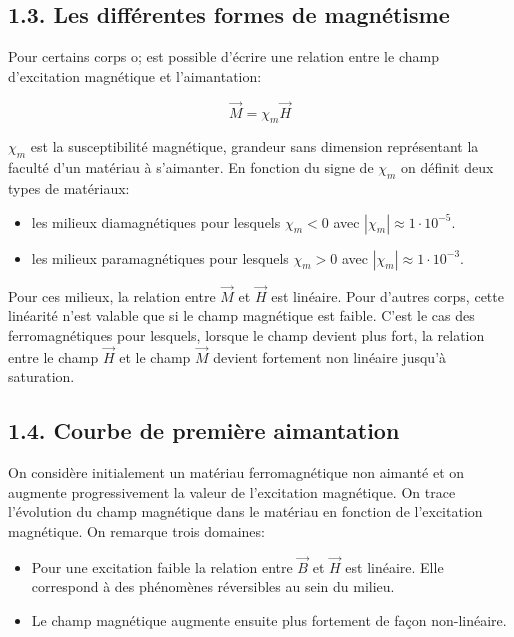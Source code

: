 \documentclass[french, a4paper, 10pt, twocolumn, landscape]{article}
\begin{document}
\subsection*{1.3. Les différentes formes de magnétisme}

Pour certains corps o; est possible d'écrire une relation entre le champ d'excitation magnétique et l'aimantation:

\begin{equation}
    \vec{M}=\chi_m\vec{H}
\end{equation}

$\chi_m$ est la susceptibilité magnétique, grandeur sans dimension représentant la faculté d'un matériau à s'aimanter. En fonction du signe de $\chi_m$ on définit deux types de matériaux:

\begin{itemize}
    \item les milieux diamagnétiques pour lesquels $\chi_m<0$ avec $|\chi_m|\approx 1\cdot10^{-5}$.
    \item les milieux paramagnétiques pour lesquels $\chi_m>0$ avec $|\chi_m|\approx 1\cdot10^{-3}$.
\end{itemize}

Pour ces milieux, la relation entre $\vec{M}$ et $\vec{H}$ est linéaire. Pour d'autres corps, cette linéarité n'est valable que si le champ magnétique est faible. C'est le cas des ferromagnétiques pour lesquels, lorsque le champ devient plus fort, la relation entre le champ $\vec{H}$ et le champ $\vec{M}$ devient fortement non linéaire jusqu'à saturation.

\subsection*{1.4. Courbe de première aimantation}

On considère initialement un matériau ferromagnétique non aimanté et on augmente progressivement la valeur de l'excitation magnétique. On trace l'évolution du champ magnétique dans le matériau en fonction de l'excitation magnétique. On remarque trois domaines:

\begin{itemize}
    \item Pour une excitation faible la relation entre $\vec{B}$ et $\vec{H}$ est linéaire. Elle correspond à des phénomènes réversibles au sein du milieu.
    \item Le champ magnétique augmente ensuite plus fortement de façon non-linéaire.
\end{itemize}
\end{document}
